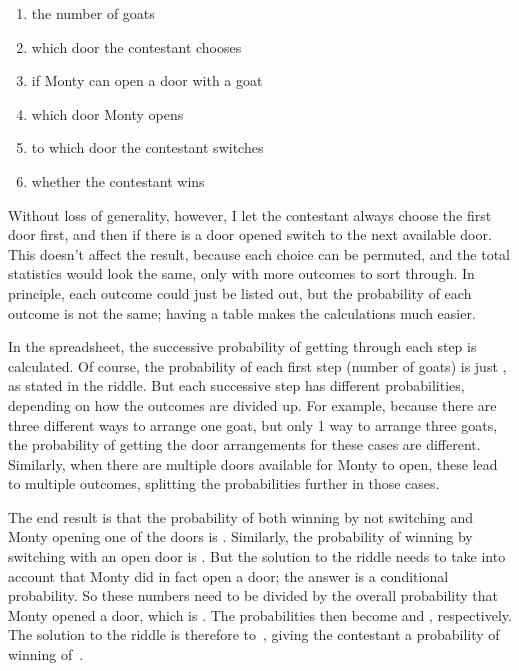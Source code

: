 \documentclass{article}
\begin{document}
\begin{enumerate}
\item the number of goats
\item which door the contestant chooses
\item if Monty can open a door with a goat
\item which door Monty opens
\item to which door the contestant switches
\item whether the contestant wins
\end{enumerate}

Without loss of generality, however, I let the contestant always choose the first door first, and then if there is a door opened switch to the next available door.
This doesn't affect the result, because each choice can be permuted, and the total statistics would look the same, only with more outcomes to sort through.
In principle, each outcome could just be listed out, but the probability of each outcome is not the same; having a table makes the calculations much easier.

In the spreadsheet, the successive probability of getting through each step is calculated.
Of course, the probability of each first step (number of goats) is just , as stated in the riddle.
But each successive step has different probabilities, depending on how the outcomes are divided up.
For example, because there are three different ways to arrange one goat, but only 1 way to arrange three goats, the probability of getting the door arrangements for these cases are different.
Similarly, when there are multiple doors available for Monty to open, these lead to multiple outcomes, splitting the probabilities further in those cases.

The end result is that the probability of both winning by not switching and Monty opening one of the doors is .
Similarly, the probability of winning by switching with an open door is .
But the solution to the riddle needs to take into account that Monty did in fact open a door; the answer is a conditional probability.
So these numbers need to be divided by the overall probability that Monty opened a door, which is .
The probabilities then become  and , respectively.
The solution to the riddle is therefore to
\,,
giving the contestant a probability of winning of
\,.
\end{document}
